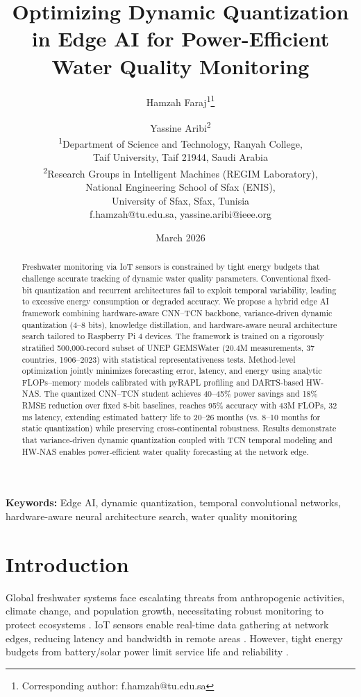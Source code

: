 \documentclass[12pt,a4paper]{article}
\title{Optimizing Dynamic Quantization in Edge AI for Power-Efficient Water Quality Monitoring}
\author{
Hamzah Faraj\textsuperscript{1}\thanks{Corresponding author: f.hamzah@tu.edu.sa} \and Yassine Aribi\textsuperscript{2}\\
\textsuperscript{1}Department of Science and Technology, Ranyah College,\\
Taif University, Taif 21944, Saudi Arabia\\
\textsuperscript{2}Research Groups in Intelligent Machines (REGIM Laboratory),\\
National Engineering School of Sfax (ENIS),\\
University of Sfax, Sfax, Tunisia\\
f.hamzah@tu.edu.sa, yassine.aribi@ieee.org
}
\date{March 2026}
\begin{document}
\maketitle

\begin{abstract}
Freshwater monitoring via IoT sensors is constrained by tight energy budgets that challenge accurate tracking of dynamic water quality parameters. Conventional fixed-bit quantization and recurrent architectures fail to exploit temporal variability, leading to excessive energy consumption or degraded accuracy. We propose a hybrid edge AI framework combining hardware-aware CNN--TCN backbone, variance-driven dynamic quantization (4--8 bits), knowledge distillation, and hardware-aware neural architecture search tailored to Raspberry Pi 4 devices. The framework is trained on a rigorously stratified 500{,}000-record subset of UNEP GEMSWater (20.4M measurements, 37 countries, 1906--2023) with statistical representativeness tests. Method-level optimization jointly minimizes forecasting error, latency, and energy using analytic FLOPs--memory models calibrated with pyRAPL profiling and DARTS-based HW-NAS. The quantized CNN--TCN student achieves 40--45\% power savings and 18\% RMSE reduction over fixed 8-bit baselines, reaches 95\% accuracy with 43M FLOPs, 32 ms latency, extending estimated battery life to 20--26 months (vs. 8--10 months for static quantization) while preserving cross-continental robustness. Results demonstrate that variance-driven dynamic quantization coupled with TCN temporal modeling and HW-NAS enables power-efficient water quality forecasting at the network edge.
\end{abstract}

\noindent\textbf{Keywords:} Edge AI, dynamic quantization, temporal convolutional networks, hardware-aware neural architecture search, water quality monitoring

\section{Introduction}

Global freshwater systems face escalating threats from anthropogenic activities, climate change, and population growth, necessitating robust monitoring to protect ecosystems \cite{campos2026automl}. IoT sensors enable real-time data gathering at network edges, reducing latency and bandwidth in remote areas \citep{essamlali2024iotml}. However, tight energy budgets from battery/solar power limit service life and reliability \citep{zheng2025crossbasin}.
\end{document}
